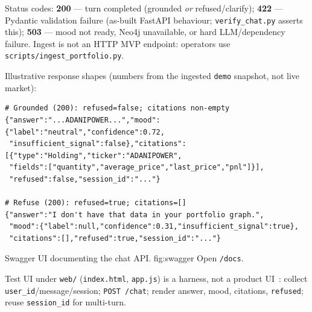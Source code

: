 \noindent
Status codes: \textbf{200} --- turn completed (grounded \emph{or} refused/clarify); \textbf{422} --- Pydantic validation failure (as-built FastAPI behaviour; \texttt{verify\_chat.py} asserts this); \textbf{503} --- mood not ready, Neo4j unavailable, or hard LLM/dependency failure. Ingest is not an HTTP MVP endpoint: operators use \texttt{scripts/ingest\_portfolio.py}.

\noindent
Illustrative response shapes (numbers from the ingested \texttt{demo} snapshot, not live market):

\begin{verbatim}
# Grounded (200): refused=false; citations non-empty
{"answer":"...ADANIPOWER...","mood":{"label":"neutral","confidence":0.72,
 "insufficient_signal":false},"citations":[{"type":"Holding","ticker":"ADANIPOWER",
 "fields":["quantity","average_price","last_price","pnl"]}],
 "refused":false,"session_id":"..."}

# Refuse (200): refused=true; citations=[]
{"answer":"I don't have that data in your portfolio graph.",
 "mood":{"label":null,"confidence":0.31,"insufficient_signal":true},
 "citations":[],"refused":true,"session_id":"..."}
\end{verbatim}

%
{Swagger UI documenting the chat API.}%
{fig:swagger}%
{Open \texttt{/docs}.}

\noindent
Test UI under \texttt{web/} (\texttt{index.html}, \texttt{app.js}) is a harness, not a product UI~\cite{prd}: collect \texttt{user\_id}/message/session; \texttt{POST /chat}; render answer, mood, citations, \texttt{refused}; reuse \texttt{session\_id} for multi-turn.
